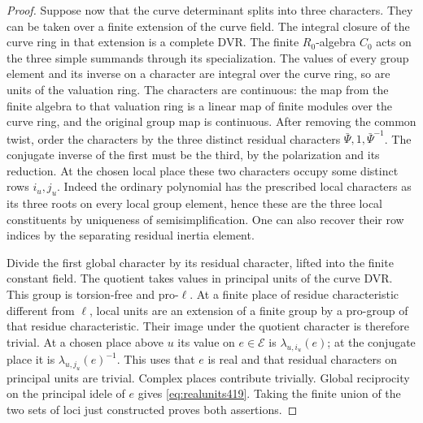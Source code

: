 \documentclass[a4paper,11pt]{article}
\theoremstyle{definition}
\theoremstyle{remark}
\numberwithin{equation}{section}
\begin{document}
\begin{proof}
Suppose now that the curve determinant splits into three
characters. They can be taken over a finite extension of
the curve field. The integral closure of the curve ring in that
extension is a complete DVR. The finite \(R_0\)-algebra \(C_0\)
acts on the three simple summands through its specialization.
The values of every group element and its inverse on a
character are integral over the curve ring, so are units of
the valuation ring. The characters are continuous: the map
from the finite algebra to that valuation ring is a linear
map of finite modules over the curve ring, and the original
group map is continuous. After removing the common twist,
order the characters by the three distinct residual
characters \(\bar\Psi,1,\bar\Psi^{-1}\). The conjugate inverse
of the first must be the third, by the polarization and its
reduction. At the chosen local place these two characters
occupy some distinct rows \(i_u,j_u\). Indeed the ordinary
polynomial has the prescribed local characters as its three
roots on every local group element, hence these are the
three local constituents by uniqueness of semisimplification.
One can also recover their row indices by the separating
residual inertia element.

Divide the first global character by its residual character,
lifted into the finite constant field. The quotient takes
values in principal units of the curve DVR. This group is
torsion-free and pro-\(\ell\). At a finite place of residue
characteristic different from \(\ell\), local units are an
extension of a finite group by a pro-group of that residue
characteristic. Their image under the quotient character is
therefore trivial. At a chosen place above \(u\) its value
on \(e\in\mathcal E\) is \(\lambda_{u,i_u}(e)\); at the
conjugate place it is \(\lambda_{u,j_u}(e)^{-1}\). This uses
that \(e\) is real and that residual characters on principal
units are trivial. Complex places contribute trivially.
Global reciprocity on the principal idele of \(e\) gives
\eqref{eq:realunits419}. Taking the finite union of the two
sets of loci just constructed proves both assertions.
\end{proof}
\end{document}
